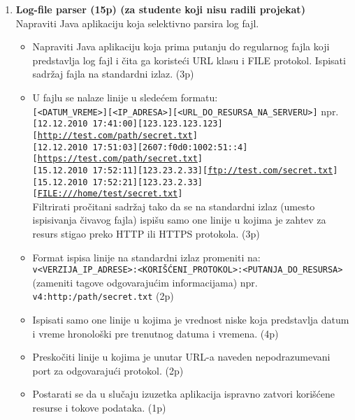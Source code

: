 \documentclass[]{article}
\begin{document}
\begin{enumerate}

\item \textbf{Log-file parser (15p) (za studente koji nisu radili projekat)}
\\Napraviti Java aplikaciju koja selektivno parsira log fajl.
\begin{itemize}
  \item Napraviti Java aplikaciju koja prima putanju do regularnog fajla koji predstavlja log fajl i \v{c}ita ga koriste\'c{}i URL klasu i FILE protokol. Ispisati sadr\v{z}aj fajla na standardni izlaz. \hfill (3p)
  \item U fajlu se nalaze linije u slede\'c{}em formatu:\\
  \texttt{[<DATUM\_VREME>][<IP\_ADRESA>][<URL\_DO\_RESURSA\_NA\_SERVERU>]} npr.\\
  \texttt{[12.12.2010 17:41:00][123.123.123.123][\url{http://test.com/path/secret.txt}]}\\
  \texttt{[12.12.2010 17:51:03][2607:f0d0:1002:51::4][\url{https://test.com/path/secret.txt}]}\\
  \texttt{[15.12.2010 17:52:11][123.23.2.33][\url{ftp://test.com/secret.txt}]}\\
  \texttt{[15.12.2010 17:52:21][123.23.2.33][\url{FILE:///home/test/secret.txt}]}\\
  Filtrirati pro\v{c}itani sadr\v{z}aj tako da se na standardni izlaz (umesto ispisivanja \v{c}ivavog fajla) ispi\v{s}u samo one linije u kojima je zahtev za resurs stigao preko HTTP ili HTTPS protokola. \hfill (3p)
  \item Format ispisa linije na standardni izlaz promeniti na:\\
  \texttt{v<VERZIJA\_IP\_ADRESE>:<KORI\v{S}\'C{}ENI\_PROTOKOL>:<PUTANJA\_DO\_RESURSA>}\\
  (zameniti tagove odgovaraju\'c{}im informacijama) npr.\\
  \texttt{v4:http:/path/secret.txt} \hfill (2p)
  \item Ispisati samo one linije u kojima je vrednost niske koja predstavlja datum i vreme hronolo\v{s}ki pre trenutnog datuma i vremena. \hfill (4p)
  \item Presko\v{c}iti linije u kojima je unutar URL-a naveden nepodrazumevani port za odgovaraju\'c{}i protokol. \hfill (2p)
  \item Postarati se da u slu\v{c}aju izuzetka aplikacija ispravno zatvori kori\v{s}\'c{}ene resurse i tokove podataka. \hfill (1p)
\end{itemize}


\end{enumerate}
\end{document}

